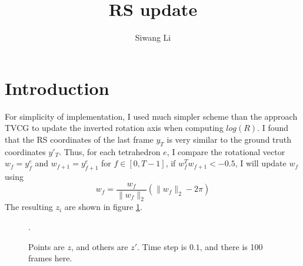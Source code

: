 \documentclass[twocolumn,a4paper]{article}
\author{Siwang Li}
\title{RS update}
\begin{document}
\maketitle

\section{Introduction}
For simplicity of implementation, I used much simpler scheme than the approach
TVCG to update the inverted rotation axis when computing $log(R)$. I found that
the RS coordinates of the last frame $y_{T}$ is very similar to the ground truth
coordinates $y'_T$. Thus, for each tetrahedron $e$, I compare the rotational
vector $w_f=y^e_{f}$ and $w_{f+1}=y^e_{f+1}$ for $f\in[0,T-1]$, if
$w_f^Tw_{f+1}<-0.5$, I will update $w_f$ using
\begin{equation}
  w_f = \frac{w_f}{\|w_f\|_2}(\|w_f\|_2-2\pi)
\end{equation}
The resulting $z_i$ are shown in figure \ref{zzc}.
\begin{figure}
  \centering
  \caption{Points are $z$, and others are $z'$. Time step is $0.1$, and there is
    100 frames here.}
  \label{zzc}.
\end{figure}
\end{document}

